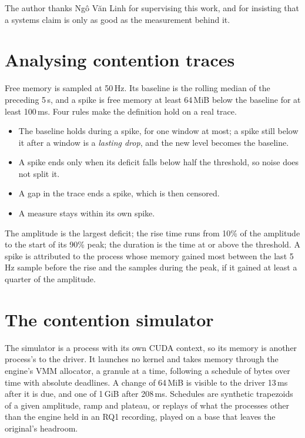 \documentclass{article}
\begin{document}
\begin{ack}
The author thanks Ng\^o V\u{a}n Linh for supervising this work, and for
insisting that a systems claim is only as good as the measurement behind it.
\end{ack}

{
\small


}

\appendix

\section{Analysing contention traces}
\label{app:spikes}

Free memory is sampled at 50\,Hz. Its baseline is the rolling median of the
preceding 5\,s, and a spike is free memory at least 64\,MiB below the baseline
for at least 100\,ms. Four rules make the definition hold on a real trace.
\begin{itemize}
\item The baseline holds during a spike, for one window at most; a spike still
below it after a window is a \textit{lasting drop}, and the new level becomes
the baseline.
\item A spike ends only when its deficit falls below half the threshold, so
noise does not split it.
\item A gap in the trace ends a spike, which is then censored.
\item A measure stays within its own spike.
\end{itemize}
The amplitude is the largest deficit; the rise time runs from 10\% of the
amplitude to the start of its 90\% peak; the duration is the time at or above
the threshold. A spike is attributed to the process whose memory gained most
between the last 5\,Hz sample before the rise and the samples during the peak,
if it gained at least a quarter of the amplitude.

\section{The contention simulator}
\label{app:simulator}

The simulator is a process with its own CUDA context, so its memory is another
process's to the driver. It launches no kernel and takes memory through the
engine's VMM allocator, a granule at a time, following a schedule of bytes over
time with absolute deadlines. A change of 64\,MiB is visible to the driver
13\,ms after it is due, and one of 1\,GiB after 208\,ms. Schedules are
synthetic trapezoids of a given amplitude, ramp and plateau, or replays of what
the processes other than the engine held in an RQ1 recording, played on a base
that leaves the original's headroom.
\end{document}
